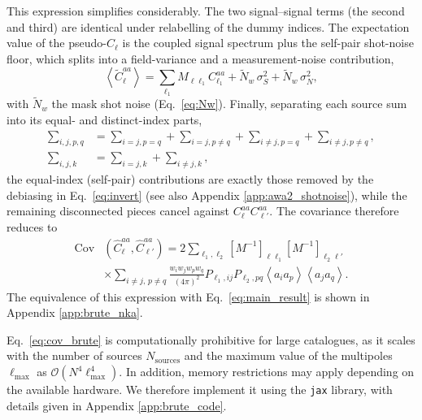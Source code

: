 \documentclass[aps,twocolumn, superscriptaddress, english, nofootinbib, 10pt]{revtex4-2}
\begin{document}
This expression simplifies considerably. The two signal--signal terms (the second and third) are identical under relabelling of the dummy indices. The expectation value of the pseudo-$C_\ell$ is the coupled signal spectrum plus the self-pair shot-noise floor, which splits into a field-variance and a measurement-noise contribution,
\begin{equation}
    \left\langle \tilde{C}_{\ell}^{aa} \right\rangle = \sum_{\ell_1} M_{\ell\ell_1} C_{\ell_1}^{aa}  + \tilde{N}_{w} \, \sigma_{S}^{2} + \tilde{N}_{w} \, \sigma_{N}^{2},
\end{equation}
with $\tilde{N}_w$ the mask shot noise (Eq.~\ref{eq:Nw}). Finally, separating each source sum into its equal- and distinct-index parts,
\begin{equation}
\begin{aligned}
    \sum_{i,j, p, q} &= \sum_{i=j, p= q} + \sum_{i=j, p\not= q} + \sum_{i\not=j, p= q} + \sum_{i\not=j, p\not= q},\\
    \sum_{i,j, k} &= \sum_{i=j, k} + \sum_{i\not=j, k},
\end{aligned}
\end{equation}
the equal-index (self-pair) contributions are exactly those removed by the debiasing in Eq.~\ref{eq:invert} (see also Appendix \ref{app:awa2_shotnoise}), while the remaining disconnected pieces cancel against $C_\ell^{aa}C_{\ell'}^{aa}$. The covariance therefore reduces to
\begin{equation} \label{eq:cov_brute}
\begin{split}
    \mathrm{Cov}&(\hat{C}_\ell^{aa}, \hat{C}_{\ell'}^{aa})  =  2\sum_{\ell_1,\ell_2} [M^{-1}]_{\ell\ell_1} [M^{-1}]_{\ell_2\ell'} \\
    &\times \sum_{i \not= j,\, p \not= q}\frac{w_i w_jw_p w_q}{(4\pi)^2}   P_{\ell_1, ij} P_{\ell_2, pq}
     \left\langle a_i a_p \right\rangle \left\langle a_j a_q \right\rangle.
\end{split}
\end{equation}
The equivalence of this expression with Eq.~\ref{eq:main_result} is shown in Appendix \ref{app:brute_nka}.

 Eq.~\ref{eq:cov_brute} is computationally prohibitive for large catalogues, as it scales with the number of sources $N_\mathrm{sources}$ and the maximum value of the multipoles $\ell_\mathrm{max}$  as $\mathcal{O}(N^4 \ell_\mathrm{max}^4)$. In addition, memory restrictions may apply depending on the available hardware. We therefore implement it using the \texttt{jax} \cite{jax2018github} library, with details given in Appendix \ref{app:brute_code}.
 
\end{document}
